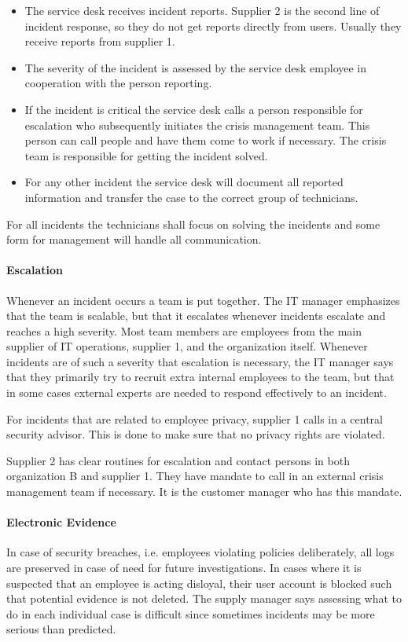 \begin{itemize}
\item The service desk receives incident reports. Supplier 2 is the second line of incident response, so they do not get reports directly from users. Usually they receive reports from supplier 1.
\item The severity of the incident is assessed by the service desk employee in cooperation with the person reporting.
\item If the incident is critical the service desk calls a person responsible for escalation who subsequently initiates the crisis management team. This person can call people and have them come to work if necessary. The crisis team is responsible for getting the incident solved.
\item For any other incident the service desk will document all reported information and transfer the case to the correct group of technicians.
\end{itemize}

For all incidents the technicians shall focus on solving the incidents and some form for management will handle all communication. 

\paragraph{Escalation}
Whenever an incident occurs a team is put together. The IT manager emphasizes that the team is scalable, but that it escalates whenever incidents escalate and reaches a high severity. Most team members are employees from the main supplier of IT operations, supplier 1, and the organization itself. Whenever incidents are of such a severity that escalation is necessary, the IT manager says that they primarily try to recruit extra internal employees to the team, but that in some cases external experts are needed to respond effectively to an incident.

For incidents that are related to employee privacy, supplier 1 calls in a central security advisor. This is done to make sure that no privacy rights are violated.

Supplier 2 has clear routines for escalation and contact persons in both organization B and supplier 1. They have mandate to call in an external crisis management team if necessary. It is the customer manager who has this mandate. 

\paragraph{Electronic Evidence}
In case of security breaches, i.e. employees violating policies deliberately, all logs are preserved in case of need for future investigations. In cases where it is suspected that an employee is acting disloyal, their user account is blocked such that potential evidence is not deleted. The supply manager says assessing what to do in each individual case is difficult since sometimes incidents may be more serious than predicted. 

